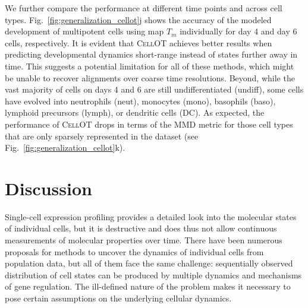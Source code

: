 We further compare the performance at different time points and across cell types.
Fig.~\ref{fig:generalization_cellot}j shows the accuracy of the modeled development of multipotent cells using map $T_m$ individually for day 4 and day 6 cells, respectively. It is evident that \textsc{CellOT} achieves better results when predicting developmental dynamics short-range instead of states further away in time.
This suggests a potential limitation for all of these methods, which might be unable to recover alignments over coarse time resolutions.
Beyond, while the vast majority of cells on days 4 and 6 are still undifferentiated (undiff), some cells have evolved into neutrophils (neut), monocytes (mono), basophils (baso), lymphoid precursors (lymph), or dendritic cells (DC).
As expected, the performance of \textsc{CellOT} drops in terms of the \acrshort{MMD} metric for those cell types that are only sparsely represented in the dataset (see Fig.~\ref{fig:generalization_cellot}k).




\section{Discussion}


Single-cell expression profiling provides a detailed look into the molecular states of individual cells, but it is destructive and does thus not allow continuous measurements of molecular properties over time. There have been numerous proposals for methods to uncover the dynamics of individual cells from population data, but all of them face the same challenge: sequentially observed distribution of cell states can be produced by multiple dynamics and mechanisms of gene regulation. The ill-defined nature of the problem makes it necessary to pose certain assumptions on the underlying cellular dynamics.

